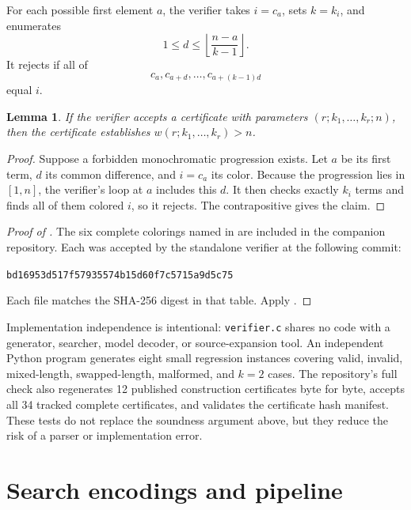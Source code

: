 \documentclass[11pt]{article}
\newtheorem{lemma}{Lemma}
\newcommand{\interval}[1]{[1,#1]}
\begin{document}
For each possible first element \(a\), the verifier takes \(i=c_a\), sets
\(k=k_i\), and enumerates
\[
  1\leq d\leq \left\lfloor\frac{n-a}{k-1}\right\rfloor.
\]
It rejects if all of
\[
  c_a,c_{a+d},\ldots,c_{a+(k-1)d}
\]
equal \(i\).

\begin{lemma}
\label{lem:verifier}
If the verifier accepts a certificate with parameters
\((r;k_1,\ldots,k_r;n)\), then the certificate establishes
\(w(r;k_1,\ldots,k_r)>n\).
\end{lemma}

\begin{proof}
Suppose a forbidden monochromatic progression exists.  Let \(a\) be its
first term, \(d\) its common difference, and \(i=c_a\) its color.  Because
the progression lies in \(\interval n\), the verifier's loop at \(a\)
includes this \(d\).  It then checks exactly \(k_i\) terms and finds all of
them colored \(i\), so it rejects.  The contrapositive gives the claim.
\end{proof}

\begin{proof}[Proof of ]
The six complete colorings named in  are included in
the companion repository.  Each was accepted by the standalone verifier at
the following commit:
\begin{center}
\small\texttt{bd16953d517f57935574b15d60f7c5715a9d5c75}
\end{center}
Each file matches the SHA-256 digest in that table.  Apply
.
\end{proof}

Implementation independence is intentional: \texttt{verifier.c} shares no
code with a generator, searcher, model decoder, or source-expansion tool.
An independent Python program generates eight small regression instances
covering valid, invalid, mixed-length, swapped-length, malformed, and
\(k=2\) cases.  The repository's full check also regenerates 12 published
construction certificates byte for byte, accepts all 34 tracked complete
certificates, and validates the certificate hash manifest.  These tests do
not replace the soundness argument above, but they reduce the risk of a
parser or implementation error.

\section{Search encodings and pipeline}
\label{sec:search}
\end{document}
